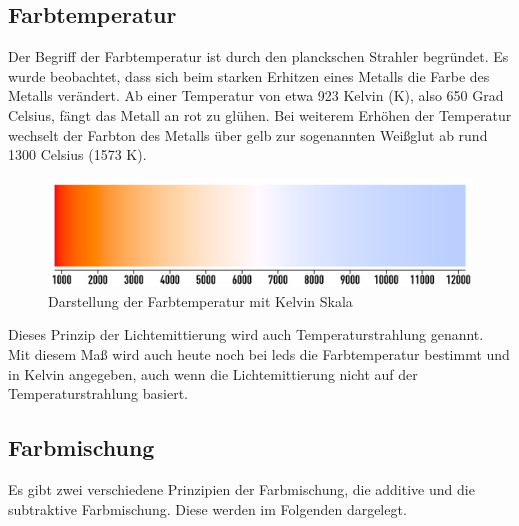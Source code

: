 \documentclass[11pt]{scrartcl}
\begin{document}
\subsection{Farbtemperatur}
Der Begriff der Farbtemperatur ist durch den planckschen Strahler begründet. Es wurde beobachtet, dass sich beim starken Erhitzen eines
Metalls die Farbe des Metalls verändert. Ab einer Temperatur von etwa 923 Kelvin (K), also 650 Grad Celsius, fängt das Metall an rot zu
glühen. Bei weiterem Erhöhen der Temperatur wechselt der Farbton des Metalls über gelb zur sogenannten Weißglut ab rund 1300 Celsius (1573 K). %
\begin{figure}[H]
    \begin{center}
        \includegraphics[width=.8\textwidth]{images/thermal_radiation_figure.png}
    \end{center}
    \caption[Darstellung der Farbtemperatur mit Kelvin Skala]{Darstellung der Farbtemperatur mit Kelvin Skala \cite{wikiFarbtemperatur}}
\end{figure}
\noindent
Dieses Prinzip der Lichtemittierung wird auch Temperaturstrahlung genannt.\\
Mit diesem Maß wird auch heute noch bei \ac{led}s die Farbtemperatur bestimmt und in Kelvin angegeben, auch wenn die Lichtemittierung nicht
auf der Temperaturstrahlung basiert.
\subsection{Farbmischung}
Es gibt zwei verschiedene Prinzipien der Farbmischung, die additive und die subtraktive Farbmischung. Diese werden im Folgenden dargelegt.
\end{document}

